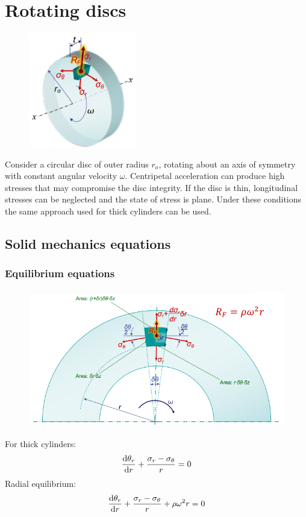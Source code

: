 \documentclass[class=report, crop=false, 12pt,a4paper]{standalone}
\begin{document}
\section{Rotating discs}
\begin{figure}[H]
    \centering
    \includegraphics[height = 5cm]{../img/diagram127.png}
    \caption{}
\end{figure}
Consider a circular disc of outer radius $r_{o}$, rotating about an axis of symmetry with constant angular velocity $\omega$. Centripetal acceleration can produce high stresses that may compromise the disc integrity. If the disc is thin, longitudinal stresses can be neglected and the state of stress is plane. Under these conditions the same approach used for thick cylinders can be used.
\subsection{Solid mechanics equations}
\subsubsection{Equilibrium equations}
\begin{figure}[H]
    \centering
    \includegraphics[height = 6cm]{../img/diagram129.png}
    \caption{}
\end{figure}
For thick cylinders: 
\begin{equation}
    \frac{\dif \theta_r}{\dif r} + \frac{\sigma_r - \sigma_{\theta}}{r} =0 
\end{equation}
Radial equilibrium:
\begin{equation}
    \frac{\dif \theta_r}{\dif r} + \frac{\sigma_r - \sigma_{\theta}}{r} + \rho \omega^2 r = 0
\end{equation}
\end{document}
